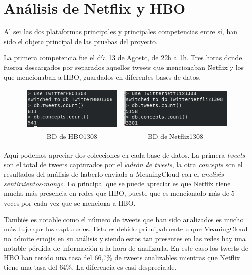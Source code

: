 \section{Análisis de Netflix y HBO}
Al ser las dos plataformas principales y principales competencias entre sí, han sido el objeto principal de las pruebas del proyecto. 

La primera competencia fue el día 13 de Agosto, de 22h a 1h. Tres horas donde fueron descargados por separados aquellos tweets que mencionaban Netflix y los que mencionaban a HBO, guardados en diferentes bases de datos. 

\begin{figure}[H]
	\centering
	\begin{tabular}{c c}
		
		\includegraphics[scale=.62]{imagenes/HBO1308Mongo.png}
		&  \includegraphics[scale=.65]{imagenes/Netflix1308Mongo.png} \\ 
		
		{BD de HBO1308}
		
		&  {BD de Netflix1308} \\ 
		
	\end{tabular} 
	\label{fig:Mongo1308}
\end{figure}

Aquí podemos apreciar dos colecciones en cada base de datos. La primera \textit{tweets} son el total de tweets capturados por el \textit{ladrón de tweets}, la otra \textit{concepts} son el resultados del análisis de haberlo enviado a MeaningCloud con el \textit{analisis-sentimientos-mongo}. Lo principal que se puede apreciar es que Netflix tiene mucha más presencia en redes que HBO, puesto que es mencionado más de 5 veces por cada vez que se menciona a HBO. 

Tambiés es notable como el número de tweets que han sido analizados es mucho más bajo que los capturados. Esto es debido principalmente a que MeaningCloud no admite emojis en su análisis y siendo estos tan presentes en las redes hay una notable pérdida de información a la hora de analizarla. En este caso los tweets de HBO han tenido una tasa del 66,7\% de tweets analizables mientras que Netflix tiene una tasa del 64\%. La diferencia es casi despreciable. 


